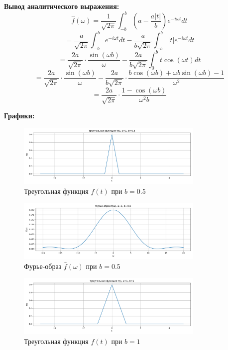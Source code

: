\textbf{Вывод аналитического выражения:}
\[
\hat{f}(\omega) = \frac{1}{\sqrt{2\pi}} \int_{-b}^{b} \left(a - \frac{a |t|}{b}\right) e^{-i \omega t} dt
\]
\[
= \frac{a}{\sqrt{2\pi}} \int_{-b}^{b} e^{-i \omega t} dt - \frac{a}{b\sqrt{2\pi}} \int_{-b}^{b} |t| e^{-i \omega t} dt
\]
\[
= \frac{2a}{\sqrt{2\pi}} \cdot \frac{\sin(\omega b)}{\omega} - \frac{2a}{b\sqrt{2\pi}} \int_{0}^{b} t \cos(\omega t) dt
\]
\[
= \frac{2a}{\sqrt{2\pi}} \cdot \frac{\sin(\omega b)}{\omega} - \frac{2a}{b\sqrt{2\pi}} \cdot \frac{b \cos(\omega b) + \omega b \sin(\omega b) - 1}{\omega^2}
\]
\[
= \frac{2a}{\sqrt{2\pi}} \cdot \frac{1 - \cos(\omega b)}{\omega^2 b}
\]

\textbf{Графики:}

\begin{figure}[H]
    \centering
    \includegraphics[width=0.8\textwidth]{python/triangle_function_b0.5.png}
    \caption{Треугольная функция $f(t)$ при $b = 0.5$}
\end{figure}

\begin{figure}[H]
    \centering
    \includegraphics[width=0.8\textwidth]{python/triangle_fourier_b0.5.png}
    \caption{Фурье-образ $\hat{f}(\omega)$ при $b = 0.5$}
\end{figure}

\begin{figure}[H]
    \centering
    \includegraphics[width=0.8\textwidth]{python/triangle_function_b1.png}
    \caption{Треугольная функция $f(t)$ при $b = 1$}
\end{figure}

